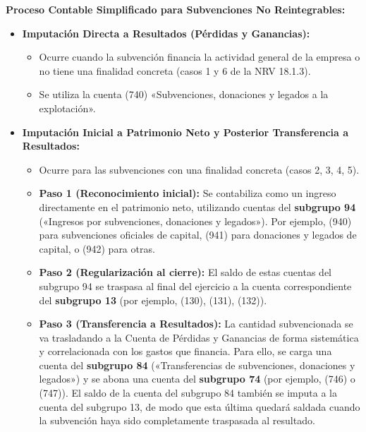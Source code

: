 \documentclass[
  paper=a4,
  ,captions=tableheading
]{scrbook}
\providecommand{\tightlist}{%
  \setlength{\itemsep}{0pt}\setlength{\parskip}{0pt}}
\begin{document}
\textbf{Proceso Contable Simplificado para Subvenciones No
Reintegrables:}

\begin{itemize}
\tightlist
\item
  \textbf{Imputación Directa a Resultados (Pérdidas y Ganancias):}

  \begin{itemize}
  \tightlist
  \item
    Ocurre cuando la subvención financia la actividad general de la
    empresa o no tiene una finalidad concreta (casos 1 y 6 de la NRV
    18.1.3).
  \item
    Se utiliza la cuenta (740) «Subvenciones, donaciones y legados a la
    explotación».
  \end{itemize}
\item
  \textbf{Imputación Inicial a Patrimonio Neto y Posterior Transferencia
  a Resultados:}

  \begin{itemize}
  \tightlist
  \item
    Ocurre para las subvenciones con una finalidad concreta (casos 2, 3,
    4, 5).
  \item
    \textbf{Paso 1 (Reconocimiento inicial):} Se contabiliza como un
    ingreso directamente en el patrimonio neto, utilizando cuentas del
    \textbf{subgrupo 94} («Ingresos por subvenciones, donaciones y
    legados»). Por ejemplo, (940) para subvenciones oficiales de
    capital, (941) para donaciones y legados de capital, o (942) para
    otras.
  \item
    \textbf{Paso 2 (Regularización al cierre):} El saldo de estas
    cuentas del subgrupo 94 se traspasa al final del ejercicio a la
    cuenta correspondiente del \textbf{subgrupo 13} (por ejemplo, (130),
    (131), (132)).
  \item
    \textbf{Paso 3 (Transferencia a Resultados):} La cantidad
    subvencionada se va trasladando a la Cuenta de Pérdidas y Ganancias
    de forma sistemática y correlacionada con los gastos que financia.
    Para ello, se carga una cuenta del \textbf{subgrupo 84}
    («Transferencias de subvenciones, donaciones y legados») y se abona
    una cuenta del \textbf{subgrupo 74} (por ejemplo, (746) o (747)). El
    saldo de la cuenta del subgrupo 84 también se imputa a la cuenta del
    subgrupo 13, de modo que esta última quedará saldada cuando la
    subvención haya sido completamente traspasada al resultado.
  \end{itemize}
\end{itemize}
\end{document}
